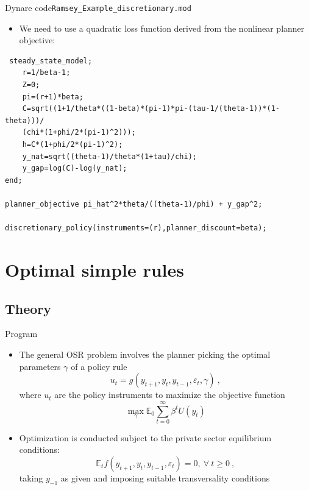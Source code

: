 \documentclass[handout,usepdftitle=false,xcolor=dvipsnames,aspectratio=169]{beamer}
\begin{document}
\begin{frame}[fragile]{Dynare code}{\texttt{Ramsey\_Example\_discretionary.mod}}
  \begin{itemize}
    \item We need to use a quadratic loss function derived from the nonlinear planner objective:
  \end{itemize}
\small
\begin{verbatim}
 steady_state_model;
    r=1/beta-1;
    Z=0;
    pi=(r+1)*beta;
    C=sqrt((1+1/theta*((1-beta)*(pi-1)*pi-(tau-1/(theta-1))*(1-theta)))/
    (chi*(1+phi/2*(pi-1)^2)));
    h=C*(1+phi/2*(pi-1)^2);
    y_nat=sqrt((theta-1)/theta*(1+tau)/chi);
    y_gap=log(C)-log(y_nat);
end;

planner_objective pi_hat^2*theta/((theta-1)/phi) + y_gap^2;

discretionary_policy(instruments=(r),planner_discount=beta); 
\end{verbatim}
\end{frame}

\section{Optimal simple rules}

\subsection{Theory}

\begin{frame}{Program}
  \begin{itemize}
    \item The general OSR problem involves the planner picking the optimal parameters $\gamma$ of a policy rule
          \begin{equation}
            u_t = g(y_{t+1},y_{t},y_{t-1},\varepsilon_t, \gamma) \: ,
          \end{equation}
          where $u_t$ are the policy instruments
          to maximize the objective function
          \begin{equation}
            \max_{\gamma} \mathbb{E}_0 \sum_{t=0}^\infty\beta^{t}U(y_t) 
          \end{equation}
    \item Optimization is conducted subject to the private sector equilibrium conditions:
          \begin{equation}
            \mathbb{E}_{t}f(y_{t+1}, y_{t}, y_{t-1}, \varepsilon_{t})=0,~\forall \:  t \geq 0 \: ,
          \end{equation}
          taking $y_{-1}$ as given and imposing suitable transversality conditions
  \end{itemize}

\end{frame}
\end{document}
